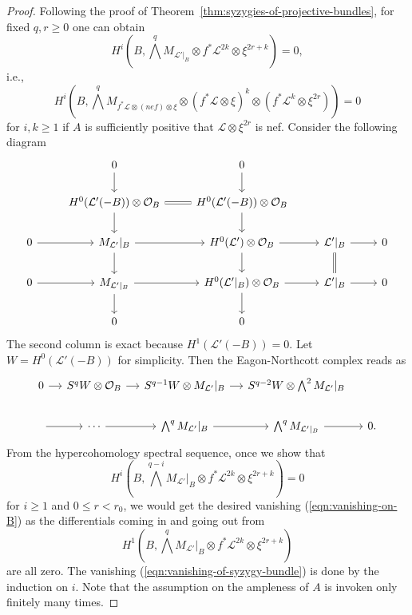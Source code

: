 \documentclass[a4paper]{amsart}
\numberwithin{equation}{section}
\theoremstyle{plain}
\theoremstyle{definition}
\theoremstyle{remark}
\numberwithin{figure}{section}
\numberwithin{table}{section}
\numberwithin{equation}{section}
\def \Lcal {\mathcal{L}}
\def \Ocal {\mathcal{O}}
\begin{document}
\begin{proof}
Following the proof of Theorem~\ref{thm:syzygies-of-projective-bundles}, for fixed $q,r \geq 0$ one can obtain
 \begin{equation} \label{eqn:positivity-of-A-required-2}
  H^i \left( B, \bigwedge^q M_{\Lcal'|_B} \otimes f^{\ast}\Lcal^{2k} \otimes \xi^{2r+k} \right)
    = 0,
 \end{equation}
i.e.,
 \[
  H^i \left( B, \bigwedge^q M_{f^{\ast}\Lcal \otimes (nef) \otimes \xi} \otimes (f^{\ast}\Lcal \otimes \xi)^k \otimes (f^{\ast}\Lcal^k \otimes \xi^{2r}) \right)
    = 0
 \]
for $i, k \geq 1$ if $A$ is sufficiently positive that $\Lcal \otimes \xi^{2r}$ is nef.
Consider the following diagram
 \[
  \begin{tikzcd}
      & 0 \arrow{d} & 0 \arrow{d} & & \\
      & H^0(\Lcal'(-B)) \otimes \Ocal_B \arrow[r,equal] \arrow{d} & H^0(\Lcal'(-B)) \otimes \Ocal_B \arrow{d} & & \\
      0 \arrow{r} & M_{\Lcal'}|_B \arrow{r} \arrow{d} & H^0(\Lcal') \otimes \Ocal_B \arrow{r} \arrow{d} & \Lcal'|_B \arrow{r} \arrow[d,equal] & 0 \\
      0 \arrow{r} & M_{\Lcal'|_B} \arrow{r} \arrow{d} & H^0(\Lcal'|_B) \otimes \Ocal_B \arrow{r} \arrow{d} & \Lcal'|_B \arrow{r} & 0 \\
      & 0 & 0 & &
  \end{tikzcd}
 \]
The second column is exact because $H^1(\Lcal'(-B)) = 0$.
Let $W = H^0(\Lcal'(-B))$ for simplicity.
Then the Eagon-Northcott complex reads as
 \[
  \begin{tikzcd}[column sep=small]
      0 \arrow{r} & S^qW \otimes \Ocal_B \arrow{r} & S^{q-1}W \otimes M_{\Lcal'}|_B \arrow{r} & S^{q-2}W \otimes \bigwedge^2 M_{\Lcal'}|_B & \\
      \arrow{r} & \cdots \arrow{r} & \bigwedge^q M_{\Lcal'}|_B \arrow{r} & \bigwedge^q M_{\Lcal'|_B} \arrow{r} & 0.
  \end{tikzcd}
 \]
From the hypercohomology spectral sequence, once we show that
 \begin{equation} \label{eqn:vanishing-of-syzygy-bundle}
  H^i \left( B, \bigwedge^{q-i} M_{\Lcal'}|_B \otimes f^{\ast}\Lcal^{2k} \otimes \xi^{2r+k} \right) = 0
 \end{equation}
for $i \geq 1$ and $0 \leq r < r_0$, we would get the desired vanishing (\ref{eqn:vanishing-on-B}) as the differentials coming in and going out from
 \[
  H^1 \left( B, \bigwedge^q M_{\Lcal'}|_B \otimes f^{\ast}\Lcal^{2k} \otimes \xi^{2r+k} \right)
 \]
are all zero.
The vanishing (\ref{eqn:vanishing-of-syzygy-bundle}) is done by the induction on $i$.
Note that the assumption on the ampleness of $A$ is invoken only finitely many times.
\end{proof}
\end{document}
